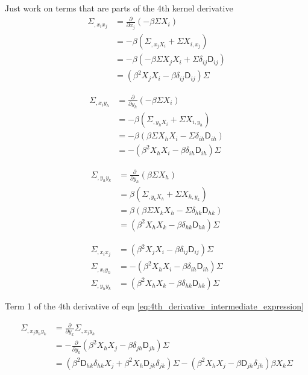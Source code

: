 Just work on terms that are parts of the 4th kernel derivative 
\begin{align*}
\Sigma_{,x_i x_j} &= \frac{\partial}{\partial x_j} (-\beta \Sigma X_i)\\
&= -\beta(\Sigma_{,x_j X_i} + \Sigma X_{i, x_j})\\ 
&= -\beta(-\beta \Sigma X_j X_i + \Sigma \delta_{ij} \mathsf{D}_{ij}) \\ 
&= (\beta^2 X_j X_i - \beta \delta_{ij} \mathsf{D}_{ij})\Sigma 
\end{align*}

\begin{align*}
\Sigma_{,x_i y_h} &= \frac{\partial}{\partial y_h} (-\beta \Sigma X_i)\\
&= -\beta(\Sigma_{,y_h X_i} + \Sigma X_{i, y_h})\\ 
&= -\beta(\beta \Sigma X_h X_i - \Sigma \delta_{ih} \mathsf{D}_{ih}) \\ 
&= -(\beta^2 X_h X_i - \beta \delta_{ih} \mathsf{D}_{ih})\Sigma 
\end{align*}

\begin{align*}
\Sigma_{,y_h y_k} &= \frac{\partial}{\partial y_h} (\beta \Sigma X_h)\\
&= \beta(\Sigma_{,y_k X_h} + \Sigma X_{h, y_k})\\ 
&= \beta(\beta \Sigma X_k X_h - \Sigma \delta_{hk} \mathsf{D}_{hk}) \\ 
&= (\beta^2 X_h X_k - \beta \delta_{hk} \mathsf{D}_{hk})\Sigma 
\end{align*}

\begin{align}
\Sigma_{,x_i x_j} &= (\beta^2 X_j X_i - \beta \delta_{ij} \mathsf{D}_{ij})\Sigma\\ 
\Sigma_{,x_i y_h} &= -(\beta^2 X_h X_i - \beta \delta_{ih} \mathsf{D}_{ih})\Sigma\\ 
\Sigma_{,y_h y_k} &= (\beta^2 X_h X_k - \beta \delta_{hk} \mathsf{D}_{hk})\Sigma 
\end{align}

Term 1 of the 4th derivative of eqn \ref{eq:4th_derivative_intermediate_expression}

\begin{align*}
\Sigma_{,x_j y_h y_k}
&= \frac{\partial}{\partial y_k} \Sigma_{,x_j y_h}\\ 
&= -\frac{\partial}{\partial y_k} (\beta^2 X_h X_j - \beta \delta_{jh} \mathsf{D}_{jh})\Sigma\\
&= (\beta^2 \mathsf{D}_{hk} \delta_{hk} X_j + \beta^2 X_h \mathsf{D}_{jk}\delta_{jk})\Sigma -
(\beta^2 X_h X_j - \beta \mathsf{D}_{jh} \delta_{jh})\beta X_k \Sigma
\end{align*}

